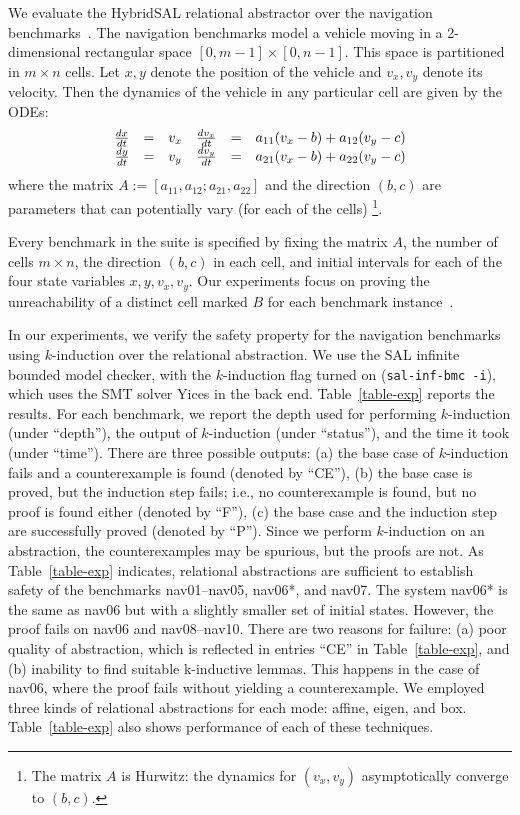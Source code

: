 \documentclass{article}
\begin{document}
We evaluate the HybridSAL relational abstractor over  the navigation
benchmarks~\cite{benchmarks}.
The navigation benchmarks model a vehicle moving in a
2-dimensional rectangular space $[0,m-1]\times [0,n-1]$.
This space is partitioned in $m\times n$ cells.  Let
$x,y$ denote the position of the vehicle and $v_x,v_y$ denote
its velocity.  Then the dynamics of the vehicle in any particular
cell are given by the ODEs:
\[
\begin{array}{rcl@{\quad}rcl}
 \frac{dx}{dt} &  = & v_x
 &
 \frac{dv_x}{dt} &  = & a_{11} (v_x - b) + a_{12} (v_y - c)
\\
 \frac{dy}{dt} &  = & v_y
 &
 \frac{dv_y}{dt} &  = & a_{21} (v_x - b) + a_{22} (v_y - c)
\end{array}
\]
where the matrix $A := [a_{11},a_{12};a_{21},a_{22}]$ and the
direction $(b,c)$ are parameters that can potentially vary 
(for each of the cells)%
\footnote{The matrix $A$ is Hurwitz:
the dynamics for $(v_x,v_y)$ asymptotically converge to
$(b,c)$.}.

Every benchmark in the suite is
specified by fixing the matrix $A$, the number of cells $m \times n$,
the direction $(b,c)$ in each cell, and initial intervals for each of
the four state variables $x,y,v_x,v_y$.   Our experiments
focus on proving the unreachability of a distinct cell marked $B$ for each benchmark instance~\cite{benchmarks}.

In our experiments, we verify the safety property for the navigation
benchmarks using $k$-induction over the relational abstraction.  We
use the SAL infinite bounded model checker, with the $k$-induction
flag turned on ({\tt{sal-inf-bmc -i}}), which uses the SMT solver
Yices in the back end.  Table~\ref{table-exp} reports the results. For
each benchmark, we report the depth used for performing $k$-induction
(under ``depth''), the output of $k$-induction (under ``status''), and
the time it took (under ``time'').  There are three possible outputs:
(a) the base case of $k$-induction fails and a counterexample is
found (denoted by ``CE''), (b) the base case is proved, but the
induction step fails; i.e., no counterexample is found, but no proof
is found either (denoted by ``F''), (c) the base case and the induction
step are successfully proved (denoted by ``P''). Since we perform
$k$-induction on an abstraction, the counterexamples may be spurious,
but the proofs are not.  As Table~\ref{table-exp} indicates,
relational abstractions are sufficient to establish safety of the
benchmarks nav01--nav05, nav06*, and nav07.  The system nav06* is the
same as nav06 but with a slightly smaller set of initial states.
However, the proof fails on nav06 and nav08--nav10.  There are two
reasons for failure: (a) poor quality of abstraction, which is
reflected in entries ``CE'' in Table~\ref{table-exp},  and (b) inability
to find suitable k-inductive lemmas. This happens in the case of
nav06, where the proof fails without yielding a counterexample.  
We employed three kinds of relational abstractions for each mode:
affine, eigen, and box.  Table~\ref{table-exp} also shows
performance of each of these techniques.
 
\end{document}
